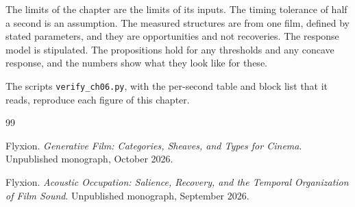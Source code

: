 \documentclass[11pt,twoside,openright]{book}
\theoremstyle{plain}
\theoremstyle{definition}
\theoremstyle{remark}
\begin{document}
The limits of the chapter are the limits of its inputs. The timing tolerance of half a second is an assumption. The measured structures are from one film, defined by stated parameters, and they are opportunities and not recoveries. The response model is stipulated. The propositions hold for any thresholds and any concave response, and the numbers show what they look like for these.

The scripts \texttt{verify\_ch06.py}, with the per-second table and block list that it reads, reproduce each figure of this chapter.

\begin{thebibliography}{99}

Flyxion.
\newblock \emph{Generative Film: Categories, Sheaves, and Types for Cinema}.
\newblock Unpublished monograph, October 2026.

Flyxion.
\newblock \emph{Acoustic Occupation: Salience, Recovery, and the Temporal Organization of Film Sound}.
\newblock Unpublished monograph, September 2026.

\end{thebibliography}
\end{document}

